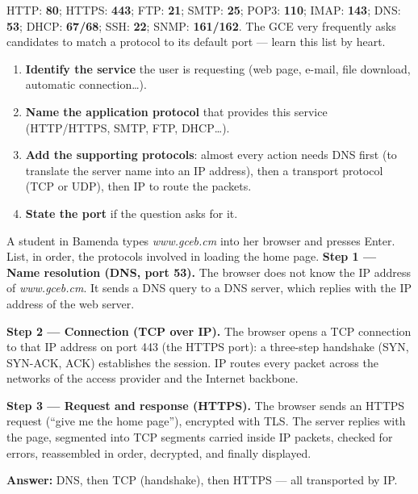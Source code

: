 \documentclass[11pt]{article}
\begin{document}
\begin{aretenir}
HTTP: \textbf{80}; HTTPS: \textbf{443}; FTP: \textbf{21}; SMTP: \textbf{25}; POP3: \textbf{110}; IMAP: \textbf{143}; DNS: \textbf{53}; DHCP: \textbf{67/68}; SSH: \textbf{22}; SNMP: \textbf{161/162}. The GCE very frequently asks candidates to match a protocol to its default port --- learn this list by heart.
\end{aretenir}

\begin{methode}
\begin{enumerate}
\item \textbf{Identify the service} the user is requesting (web page, e-mail, file download, automatic connection\ldots).
\item \textbf{Name the application protocol} that provides this service (HTTP/HTTPS, SMTP, FTP, DHCP\ldots).
\item \textbf{Add the supporting protocols}: almost every action needs DNS first (to translate the server name into an IP address), then a transport protocol (TCP or UDP), then IP to route the packets.
\item \textbf{State the port} if the question asks for it.
\end{enumerate}
\end{methode}

\begin{exoresolu}
A student in Bamenda types \emph{www.gceb.cm} into her browser and presses Enter. List, in order, the protocols involved in loading the home page.
\tcblower
\textbf{Step 1 --- Name resolution (DNS, port 53).} The browser does not know the IP address of \emph{www.gceb.cm}. It sends a DNS query to a DNS server, which replies with the IP address of the web server.

\textbf{Step 2 --- Connection (TCP over IP).} The browser opens a TCP connection to that IP address on port 443 (the HTTPS port): a three-step handshake (SYN, SYN-ACK, ACK) establishes the session. IP routes every packet across the networks of the access provider and the Internet backbone.

\textbf{Step 3 --- Request and response (HTTPS).} The browser sends an HTTPS request (``give me the home page''), encrypted with TLS. The server replies with the page, segmented into TCP segments carried inside IP packets, checked for errors, reassembled in order, decrypted, and finally displayed.

\textbf{Answer:} DNS, then TCP (handshake), then HTTPS --- all transported by IP.
\end{exoresolu}
\end{document}
